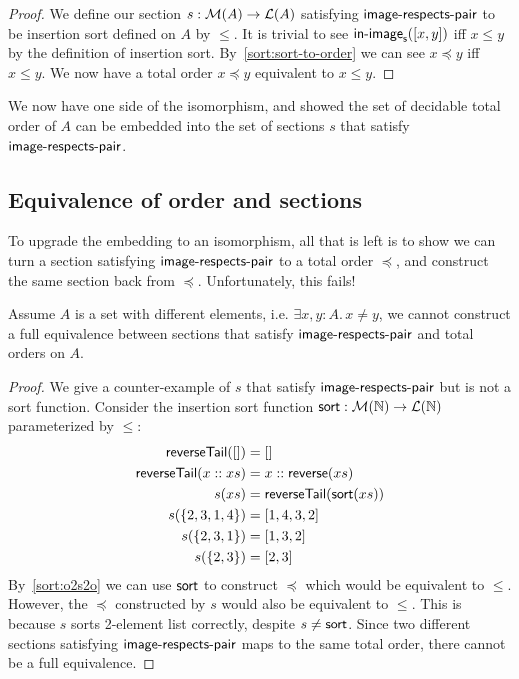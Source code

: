 \begin{proof}
    We define our section $s : \mathcal{M}(A) \to \mathcal{L}(A)$ satisfying $\operatorname{\mathsf{image-respects-pair}}$ to be
    insertion sort defined on $A$ by $\leq$.
    It is trivial to see $\operatorname{\mathsf{in-image}}_{\operatorname{\mathsf{s}}}([x, y])$ iff $x \leq y$ by the definition
    of insertion sort. By~\cref{sort:sort-to-order} we can see $x \preccurlyeq y$ iff $x \leq y$.
    We now have a total order $x \preccurlyeq y$ equivalent to $x \leq y$.
\end{proof}

We now have one side of the isomorphism, and showed the set of decidable total order of $A$
can be embedded into the set of sections $s$ that satisfy $\operatorname{\mathsf{image-respects-pair}}$.

\subsection{Equivalence of order and sections}
To upgrade the embedding to an isomorphism, all that is left
is to show we can turn a section satisfying $\operatorname{\mathsf{image-respects-pair}}$ to a total order $\preccurlyeq$, and construct the
same section back from $\preccurlyeq$. Unfortunately, this fails!

\begin{proposition}
    Assume $A$ is a set with different elements, i.e. $\exists x, y: A.\,x \neq y$,
    we cannot construct a full equivalence between sections that satisfy $\operatorname{\mathsf{image-respects-pair}}$
    and total orders on $A$.
\end{proposition}

\begin{proof}
    We give a counter-example of $s$ that satisfy $\operatorname{\mathsf{image-respects-pair}}$ but is not a sort function.
    Consider the insertion sort function $\operatorname{\mathsf{sort}} : \mathcal{M}(\mathbb{N}) \to \mathcal{L}(\mathbb{N})$
    parameterized by $\leq$:
    \begin{align*}
        \operatorname{\mathsf{reverseTail}}([])      & = []                                  \\
        \operatorname{\mathsf{reverseTail}}(x :: xs) & = x :: \operatorname{\mathsf{reverse}}(xs)             \\
        s(xs)                       & = \operatorname{\mathsf{reverseTail}}(\operatorname{\mathsf{sort}}(xs)) \\
        s(\{2,3,1,4\})              & = [1,4,3,2]                           \\
        s(\{2,3,1\})                & = [1, 3, 2]                           \\
        s(\{2,3\})                  & = [2, 3]                              \\
    \end{align*}
    By~\cref{sort:o2s2o} we can use $\operatorname{\mathsf{sort}}$ to construct $\preccurlyeq$ which would be
    equivalent to $\leq$. However, the $\preccurlyeq$ constructed by $s$ would also be equivalent
    to $\leq$. This is because $s$ sorts 2-element list correctly, despite $s \neq \operatorname{\mathsf{sort}}$.
    Since two different sections satisfying $\operatorname{\mathsf{image-respects-pair}}$ maps to the same total order,
    there cannot be a full equivalence.
\end{proof}

